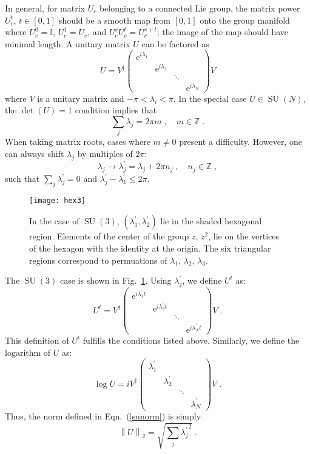 \documentclass[preprint,aps,prd]{revtex4-2}
\newcommand{\da}{\dagger}  %
\newcommand{\be}{\begin{equation}}
\newcommand{\eq}{\end{equation}}
\newcommand{\integer}{\mathbb{Z}}       %
\DeclareMathOperator{\SU}{SU}
\begin{document}
In general, for matrix $U_c$ belonging to a connected Lie group,
the matrix power $U_c^t$, $t\in[0,1]$ should be a
smooth map from $[0,1]$ onto the group manifold where
$U_c^0=\mathbb{I}$, $U_c^1=U_c$, and $U_c^s U_c^t = U_c^{s+t}$;
the image of the map should have minimal length.
A unitary matrix $U$ can be factored as
%
\be
U = V^\da \begin{pmatrix}
    \mathrm{e}^{i \lambda_1} & & &\\
    & \mathrm{e}^{i \lambda_2} & &\\
    & & \ddots & \\
    & & & \mathrm{e}^{i \lambda_N}\end{pmatrix} V
\eq
%
where $V$ is a unitary matrix and $-\pi < \lambda_i < \pi$.
In the special case $U \in \SU(N)$, the $\det(U)=1$ condition implies that
\be
\sum_j \lambda_j = 2 \pi m\;, \quad m\in\integer \;.
\eq
When taking matrix roots, cases where $m\neq 0$ present a
difficulty.  However, one can always shift $\lambda_j$ by
multiples of $2\pi$:
\be
\lambda_j \to \lambda_j^\prime = \lambda_j + 2 \pi n_j\;,\quad
n_j\in\integer \; ,
\eq
such that $\sum_j \lambda_j^\prime = 0$ and
$\lambda_j^\prime - \lambda_k^\prime \le 2 \pi$.
%
\begin{figure}
\texttt{[image: hex3]}
\caption{In the case of $\SU(3)$, $(\lambda_1^\prime,\lambda_2^\prime)$
  lie in the shaded hexagonal region.
  Elements of the center of the group $z$, $z^2$, lie on the vertices
  of the hexagon with the identity at the origin.
  The six triangular regions correspond to permuations of
  $\lambda_1$, $\lambda_2$, $\lambda_3$.   \label{hexagon}}
\end{figure}
%
The $\SU(3)$ case is shown in Fig.~\ref{hexagon}.
Using $\lambda_j^\prime$, we define $U^t$ as:
\be
U^t = V^\da \begin{pmatrix}
    \mathrm{e}^{i\lambda_1^\prime t} & & &\\
    & \mathrm{e}^{i\lambda_2^\prime t} & &\\
    & & \ddots & \\
    & & & \mathrm{e}^{i\lambda_N^\prime t}\end{pmatrix} V \; .
\eq
This definition of $U^t$ fulfills the conditions listed above.
Similarly, we define the logarithm of $U$ as:
\be
\log U = i V^\da \begin{pmatrix}
    \lambda_1^\prime & & &\\
    & \lambda_2^\prime & &\\
    & & \ddots & \\
    & & & \lambda_N^\prime\end{pmatrix} V \; .
\eq
Thus, the norm defined in Eqn.~(\ref{sunorm}) is simply
\be
\left\lVert U \right\rVert_2 = \sqrt{\sum_j {\lambda_j^\prime}^2} \; .
\eq
\end{document}
